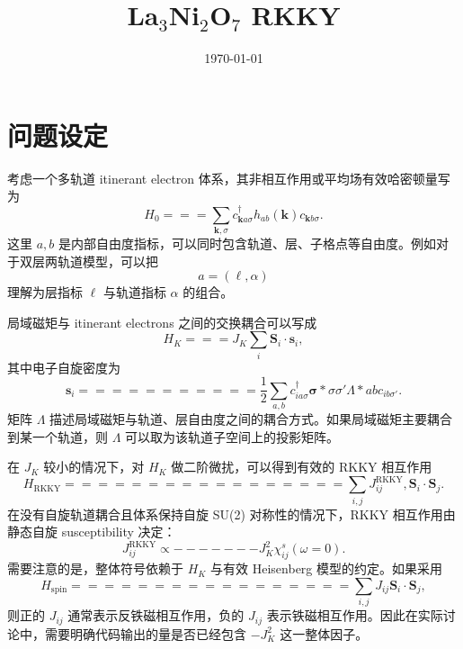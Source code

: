 \documentclass[UTF8,11pt]{ctexart}
\title{La$_3$Ni$_2$O$_7$ RKKY }
\author{}
\date{\today}
\begin{document}
\maketitle

\section{问题设定}

考虑一个多轨道 itinerant electron 体系，其非相互作用或平均场有效哈密顿量写为
\begin{equation}
    H_0
    ===
    \sum_{\mathbf k,\sigma}
    c_{\mathbf k a\sigma}^{\dagger}
    h_{ab}(\mathbf k)
    c_{\mathbf k b\sigma}.
\end{equation}
这里 $a,b$ 是内部自由度指标，可以同时包含轨道、层、子格点等自由度。例如对于双层两轨道模型，可以把
\begin{equation}
    a=(\ell,\alpha)
\end{equation}
理解为层指标 $\ell$ 与轨道指标 $\alpha$ 的组合。

局域磁矩与 itinerant electrons 之间的交换耦合可以写成
\begin{equation}
    H_K
    ===

    J_K
    \sum_i
    \mathbf S_i \cdot \mathbf s_i,
\end{equation}
其中电子自旋密度为
\begin{equation}
    \mathbf s_i
    ===========

    \frac{1}{2}
    \sum_{a,b}
    c_{ia\sigma}^{\dagger}
    \bm{\sigma}*{\sigma\sigma'}
    \Lambda*{ab}
    c_{ib\sigma'}.
\end{equation}
矩阵 $\Lambda$ 描述局域磁矩与轨道、层自由度之间的耦合方式。如果局域磁矩主要耦合到某一个轨道，则 $\Lambda$ 可以取为该轨道子空间上的投影矩阵。

在 $J_K$ 较小的情况下，对 $H_K$ 做二阶微扰，可以得到有效的 RKKY 相互作用
\begin{equation}
    H_{\mathrm{RKKY}}
    =================

    \sum_{i,j}
    J_{ij}^{\mathrm{RKKY}}
    ,
    \mathbf S_i \cdot \mathbf S_j .
\end{equation}
在没有自旋轨道耦合且体系保持自旋 SU(2) 对称性的情况下，RKKY 相互作用由静态自旋 susceptibility 决定：
\begin{equation}
    J_{ij}^{\mathrm{RKKY}}
    \propto
    -------

    J_K^2
    \chi_{ij}^{s}(\omega=0).
\end{equation}
需要注意的是，整体符号依赖于 $H_K$ 与有效 Heisenberg 模型的约定。如果采用
\begin{equation}
    H_{\mathrm{spin}}
    =================

    \sum_{i,j}
    J_{ij}
    \mathbf S_i \cdot \mathbf S_j ,
\end{equation}
则正的 $J_{ij}$ 通常表示反铁磁相互作用，负的 $J_{ij}$ 表示铁磁相互作用。因此在实际讨论中，需要明确代码输出的量是否已经包含 $-J_K^2$ 这一整体因子。
\end{document}
